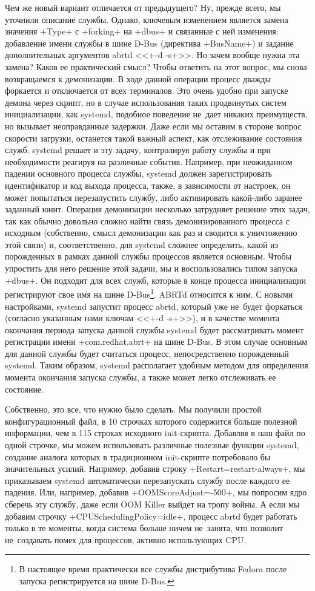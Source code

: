 \documentclass[10pt,oneside,a4paper]{article}
\begin{document}
Чем же новый вариант отличается от предыдущего? Ну, прежде всего, мы уточнили
описание службы. Однако, ключевым изменением является замена значения +Type+ с
+forking+ на +dbus+ и связанные с ней изменения: добавление имени службы в шине
D-Bus (директива +BusName+) и задание дополнительных аргументов abrtd
<<+-d -s+>>. Но зачем вообще нужна эта замена? Каков ее практический смысл?
Чтобы ответить на этот вопрос, мы снова возвращаемся к демонизации. В ходе
данной операции процесс дважды форкается и отключается от всех терминалов. Это
очень удобно при запуске демона через скрипт, но в случае использования таких
продвинутых систем инициализации, как systemd, подобное поведение не~дает
никаких преимуществ, но вызывает неоправданные задержки. Даже если мы оставим в
стороне вопрос скорости загрузки, останется такой важный аспект, как
отслеживание состояния служб.  systemd решает и эту задачу, контролируя работу
службы и при необходимости реагируя на различные события. Например, при
неожиданном падении основного процесса службы, systemd должен зарегистрировать
идентификатор и код выхода процесса, также, в зависимости от настроек, он может
попытаться перезапустить службу, либо активировать какой-либо заранее заданный
юнит. Операция демонизации несколько затрудняет решение этих задач, так как
обычно довольно сложно найти связь демонизированного процесса с исходным
(собственно, смысл демонизации как раз и сводится к уничтожению этой связи) и,
соответственно, для systemd сложнее определить, какой из порожденных в рамках
данной службы процессов является основным. Чтобы упростить для него решение этой
задачи, мы и воспользовались типом запуска +dbus+. Он подходит для всех служб,
которые в конце процесса инициализации регистрируют свое имя на шине
D-Bus\footnote{В настоящее время практически все службы дистрибутива Fedora
после запуска регистрируется на шине D-Bus.}. ABRTd относится к ним.  С новыми
настройками, systemd запустит процесс abrtd, который уже не~будет форкаться
(согласно указанным нами ключам <<+-d -s+>>), и в качестве момента окончания
периода запуска данной службы systemd будет рассматривать момент регистрации
имени +com.redhat.abrt+ на шине D-Bus. В этом случае основным для данной службы
будет считаться процесс, непосредственно порожденный systemd.  Таким образом,
systemd располагает удобным методом для определения момента окончания запуска
службы, а также может легко отслеживать ее состояние. 

Собственно, это все, что нужно было сделать. Мы получили простой
конфигурационный файл, в 10 строчках которого содержится больше полезной
информации, чем в 115 строках исходного init-скрипта. Добавляя в наш файл по
одной строчке, мы можем использовать различные полезные функции systemd,
создание аналога которых в традиционном init-скрипте потребовало бы
значительных усилий. Например, добавив строку +Restart=restart-always+, мы
приказываем systemd автоматически перезапускать службу после каждого ее
падения. Или, например, добавив +OOMScoreAdjust=-500+, мы попросим ядро сберечь
эту службу, даже если OOM Killer выйдет на тропу войны. А если мы добавим
строчку +CPUSchedulingPolicy=idle+, процесс abrtd будет работать только в те
моменты, когда система больше ничем не~занята, что позволит не~создавать помех
для процессов, активно использующих CPU. 
\end{document}
